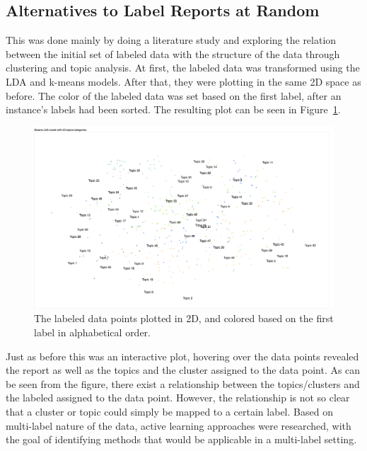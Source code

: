 \subsection{Alternatives to Label Reports at Random}

This was done mainly by doing a literature study and exploring the relation between the initial set of labeled data with the structure of the data through clustering and topic analysis.
At first, the labeled data was transformed using the LDA and k-means models.
After that, they were plotting in the same 2D space as before.
The color of the labeled data was set based on the first label, after an instance's labels had been sorted.
The resulting plot can be seen in Figure~\ref{fig:categories-lda-50}.

\begin{figure}
    \centering
    \includegraphics[scale=0.35, angle=270]{figures/categories-lda-50.png}
    \caption{The labeled data points plotted in 2D, and colored based on the first label in alphabetical order.}
    \label{fig:categories-lda-50}
\end{figure}

Just as before this was an interactive plot, hovering over the data points revealed the report as well as the topics and the cluster assigned to the data point.
As can be seen from the figure, there exist a relationship between the topics/clusters and the labeled assigned to the data point.
However, the relationship is not so clear that a cluster or topic could simply be mapped to a certain label.
Based on multi-label nature of the data, active learning approaches were researched, with the goal of identifying methods that would be applicable in a multi-label setting.


